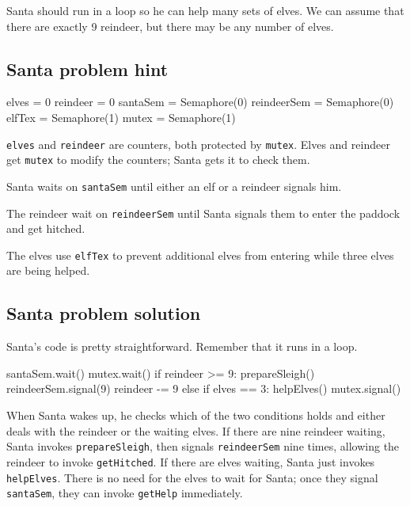 \documentclass{book}
\begin{document}
Santa should run in a loop so he can help many sets of elves.
We can assume that there are exactly 9 reindeer, but there may
be any number of elves.


\subsection {Santa problem hint}

\begin{unbreakable}[title={Santa problem hint}]{}
elves = 0
reindeer = 0
santaSem = Semaphore(0)
reindeerSem = Semaphore(0)
elfTex = Semaphore(1)
mutex = Semaphore(1)
\end{unbreakable}

{\tt elves} and {\tt reindeer} are counters, both protected
by {\tt mutex}.  Elves and reindeer get {\tt mutex} to modify the
counters; Santa gets it to check them.

Santa waits on {\tt santaSem} until either an elf or a reindeer
signals him.

The reindeer wait on {\tt reindeerSem} until Santa signals them to
enter the paddock and get hitched.

The elves use {\tt elfTex} to prevent additional elves from
entering while three elves are being helped.



\subsection {Santa problem solution}

Santa's code is pretty straightforward.  Remember that it
runs in a loop.

\begin{unbreakable}[title={Santa problem solution (Santa)}]{}
santaSem.wait()
mutex.wait()
    if reindeer >= 9:
        prepareSleigh()
	reindeerSem.signal(9)
        reindeer -= 9
    else if elves == 3:
        helpElves()
mutex.signal()
\end{unbreakable}

When Santa wakes up, he checks which of the two conditions
holds and either deals with the reindeer or the waiting elves.
If there are nine reindeer waiting,
Santa invokes {\tt prepareSleigh}, then signals {\tt reindeerSem}
nine times, allowing the reindeer to invoke {\tt getHitched}.
If there are elves waiting, Santa just
invokes {\tt helpElves}.  There is no need for the elves to wait
for Santa; once they signal {\tt santaSem}, they can
invoke {\tt getHelp} immediately.
\end{document}
